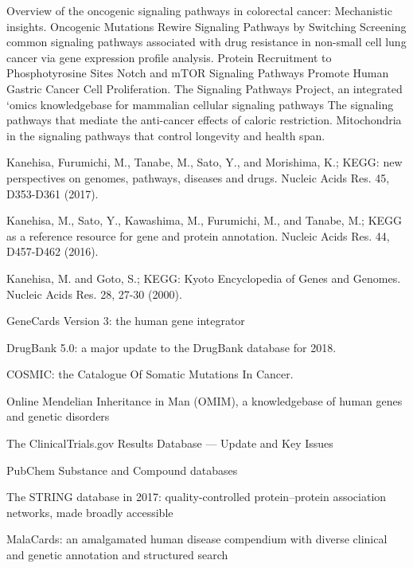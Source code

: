 















 
 Overview of the oncogenic signaling pathways in colorectal cancer: Mechanistic insights.
Oncogenic Mutations Rewire Signaling Pathways by Switching
 Screening common signaling pathways associated with drug resistance in non-small cell lung cancer via gene expression profile analysis. Protein Recruitment to Phosphotyrosine Sites
 Notch and mTOR Signaling Pathways Promote Human Gastric Cancer Cell Proliferation.
 The Signaling Pathways Project, an integrated ‘omics knowledgebase for mammalian cellular signaling pathways
 The signaling pathways that mediate the anti-cancer effects of caloric restriction.
 Mitochondria in the signaling pathways that control longevity and health span.


 Kanehisa, Furumichi, M., Tanabe, M., Sato, Y., and Morishima, K.; 
\newblock KEGG: new perspectives on genomes, pathways, diseases and drugs. 
\newblock Nucleic Acids Res. 45, D353-D361 (2017).

 Kanehisa, M., Sato, Y., Kawashima, M., Furumichi, M., and Tanabe, M.; 
\newblock KEGG as a reference resource for gene and protein annotation. 
\newblock Nucleic Acids Res. 44, D457-D462 (2016).

 Kanehisa, M. and Goto, S.; 
\newblock KEGG: Kyoto Encyclopedia of Genes and Genomes. 
\newblock Nucleic Acids Res. 28, 27-30 (2000).

GeneCards Version 3: the human gene integrator

 DrugBank 5.0: a major update to the DrugBank database for 2018.

 COSMIC: the Catalogue Of Somatic Mutations In Cancer.

 Online Mendelian Inheritance in Man (OMIM), a knowledgebase of human genes and genetic disorders

 The ClinicalTrials.gov Results Database — Update and Key Issues

 PubChem Substance and Compound databases

 The STRING database in 2017: quality-controlled protein–protein association networks, made broadly accessible

 MalaCards: an amalgamated human disease compendium with diverse clinical and genetic annotation and structured search

